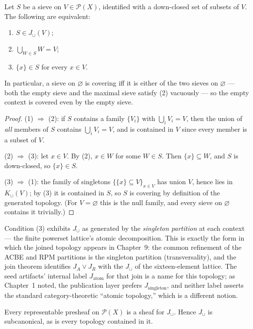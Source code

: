 \begin{proposition}\label{ch03:prop:union-characterization}
Let $S$ be a sieve on $V \in \mathcal{P}(X)$, identified with a
down-closed set of subsets of $V$. The following are equivalent:
\begin{enumerate}
\item $S \in J_{\cup}(V)$;
\item $\bigcup_{W \in S} W = V$;
\item $\{x\} \in S$ for every $x \in V$.
\end{enumerate}
In particular, a sieve on $\varnothing$ is covering iff it is
either of the two sieves on $\varnothing$ --- both the empty sieve
and the maximal sieve satisfy (2) vacuously --- so the empty
context is covered even by the empty sieve.
\end{proposition}

\begin{proof}
(1) $\Rightarrow$ (2): if $S$ contains a family
$\{V_i\}$ with $\bigcup_i V_i = V$, then the union of \emph{all}
members of $S$ contains $\bigcup_i V_i = V$, and is contained in
$V$ since every member is a subset of $V$.

(2) $\Rightarrow$ (3): let $x \in V$. By (2), $x \in W$ for some
$W \in S$. Then $\{x\} \subseteq W$, and $S$ is down-closed, so
$\{x\} \in S$.

(3) $\Rightarrow$ (1): the family of singletons
$\{\{x\} \subseteq V\}_{x \in V}$ has union $V$, hence lies in
$K_{\cup}(V)$; by (3) it is contained in $S$, so $S$ is covering
by definition of the generated topology. (For $V = \varnothing$
this is the null family, and every sieve on $\varnothing$
contains it trivially.)
\end{proof}

Condition (3) exhibits $J_{\cup}$ as generated by the
\emph{singleton partition} at each context --- the finite
powerset lattice's atomic decomposition. This is exactly the form
in which the joined topology appears in Chapter~9: the common
refinement of the ACBE and RPM partitions is the singleton
partition (transversality), and the join theorem identifies
$J_A \vee J_R$ with the $J_{\cup}$ of the sixteen-element
lattice. The seed artifacts' internal label $J_{\mathrm{atom}}$
for that join is a name for this topology; as Chapter~1 noted,
the publication layer prefers $J_{\mathrm{singleton}}$, and
neither label asserts the standard category-theoretic ``atomic
topology,'' which is a different notion.

\begin{theorem}\label{ch03:thm:union-subcanonical}
Every representable presheaf on $\mathcal{P}(X)$ is a sheaf for
$J_{\cup}$. Hence $J_{\cup}$ is subcanonical, as is every
topology contained in it.
\end{theorem}

